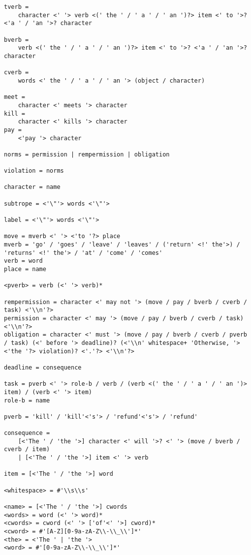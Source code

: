 \begin{lstlisting}
tverb =
    character <' '> verb <(' the ' / ' a ' / ' an ')?> item <' to '>? <'a ' / 'an '>? character

bverb =
    verb <(' the ' / ' a ' / ' an ')?> item <' to '>? <'a ' / 'an '>? character

cverb =
    words <' the ' / ' a ' / ' an '> (object / character)

meet =
    character <' meets '> character
kill =
    character <' kills '> character
pay =
    <'pay '> character

norms = permission | rempermission | obligation

violation = norms

character = name

subtrope = <'\"'> words <'\"'>

label = <'\"'> words <'\"'>

move = mverb <' '> <'to '?> place
mverb = 'go' / 'goes' / 'leave' / 'leaves' / ('return' <!' the'>) / 'returns' <!' the'> / 'at' / 'come' / 'comes'
verb = word
place = name

<pverb> = verb (<' '> verb)*

rempermission = character <' may not '> (move / pay / bverb / cverb / task) <'\\n'?>
permission = character <' may '> (move / pay / bverb / cverb / task) <'\\n'?>
obligation = character <' must '> (move / pay / bverb / cverb / pverb / task) (<' before '> deadline)? (<'\\n' whitespace+ 'Otherwise, '> <'the '?> violation)? <'.'?> <'\\n'?>

deadline = consequence

task = pverb <' '> role-b / verb / (verb <(' the ' / ' a ' / ' an ')> item) / (verb <' '> item)
role-b = name

pverb = 'kill' / 'kill'<'s'> / 'refund'<'s'> / 'refund'

consequence =
    [<'The ' / 'the '>] character <' will '>? <' '> (move / bverb / cverb / item)
    | [<'The ' / 'the '>] item <' '> verb

item = [<'The ' / 'the '>] word

<whitespace> = #'\\s\\s'

<name> = [<'The ' / 'the '>] cwords
<words> = word (<' '> word)*
<cwords> = cword (<' '> ['of'<' '>] cword)*
<cword> = #'[A-Z][0-9a-zA-Z\\-\\_\\']*'
<the> = <'The ' | 'the '>
<word> = #'[0-9a-zA-Z\\-\\_\\']*'
\end{lstlisting}

